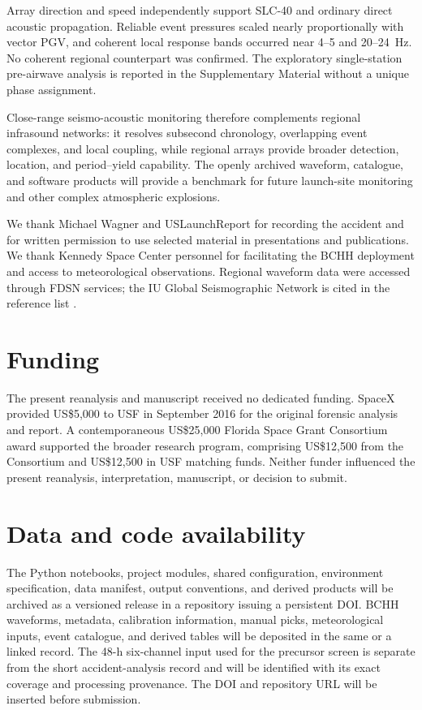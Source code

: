 \documentclass[]{seismica}
\begin{document}
Array direction and speed independently support SLC-40 and ordinary direct
acoustic propagation. Reliable event pressures scaled nearly proportionally
with vector PGV, and coherent local response bands occurred near 4--5 and
20--24~Hz. No coherent regional counterpart was confirmed. The exploratory
single-station pre-airwave analysis is reported in the Supplementary Material
without a unique phase assignment.

Close-range seismo-acoustic monitoring therefore complements regional
infrasound networks: it resolves subsecond chronology, overlapping event
complexes, and local coupling, while regional arrays provide broader detection,
location, and period--yield capability. The openly archived waveform,
catalogue, and software products will provide a benchmark for future
launch-site monitoring and other complex atmospheric explosions.

\begin{acknowledgements}
We thank Michael Wagner and USLaunchReport for recording the accident and for
written permission to use selected material in presentations and publications.
We thank Kennedy Space Center personnel for facilitating the BCHH deployment
and access to meteorological observations. Regional waveform data were
accessed through FDSN services; the IU Global Seismographic Network is cited
in the reference list \citep{asl_gsn_iu_1988}.
\end{acknowledgements}

\section*{Funding}

The present reanalysis and manuscript received no dedicated funding. SpaceX
provided US\$5,000 to USF in September 2016 for the original forensic analysis
and report. A contemporaneous US\$25,000 Florida Space Grant Consortium award
supported the broader research program, comprising US\$12,500 from the
Consortium and US\$12,500 in USF matching funds. Neither funder influenced the
present reanalysis, interpretation, manuscript, or decision to submit.

\section*{Data and code availability}

The Python notebooks, project modules, shared configuration, environment
specification, data manifest, output conventions, and derived products will be
archived as a versioned release in a repository issuing a persistent DOI. BCHH
waveforms, metadata, calibration information, manual picks, meteorological
inputs, event catalogue, and derived tables will be deposited in the same or a
linked record. The 48-h six-channel input used for the precursor screen is
separate from the short accident-analysis record and will be identified with
its exact coverage and processing provenance. The DOI and repository URL will be inserted before submission.
\end{document}

